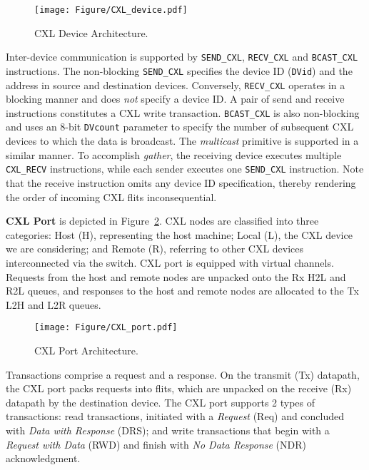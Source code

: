 \begin{figure}[h]
    \centering
    \texttt{[image: Figure/CXL\_device.pdf]}
    \caption{CXL Device Architecture.}
    \label{fig:CXL_device}
\end{figure}

Inter-device communication is supported by \texttt{SEND\_CXL}, \texttt{RECV\_CXL} and \texttt{BCAST\_CXL} instructions. The non-blocking
\texttt{SEND\_CXL} specifies the device ID (\texttt{DVid}) and the \rf{} address in source and destination devices. Conversely, \texttt{RECV\_CXL} operates in a blocking manner and does \textit{not} specify a device ID. A pair of send and receive instructions constitutes a CXL write transaction. 
\texttt{BCAST\_CXL} is also non-blocking and uses an 8-bit \texttt{DVcount} parameter to specify the number of subsequent CXL devices to which the data is broadcast.
The \textit{multicast} primitive is supported in a similar manner.
To accomplish \textit{gather}, the receiving device executes multiple \texttt{CXL\_RECV} instructions, while each sender executes one \texttt{SEND\_CXL} instruction. Note that the receive instruction omits any device ID specification, thereby rendering the order of incoming CXL flits inconsequential. 


\textbf{CXL Port} is depicted in Figure~\ref{fig:CXL_port}. 
CXL nodes are classified into three categories: Host (H), representing the host machine; Local (L), the CXL device we are considering; and Remote (R), referring to other CXL devices interconnected via the switch. CXL port is equipped with virtual channels. Requests from the host and remote nodes are unpacked onto the Rx H2L and R2L queues, and responses to the host and remote nodes are allocated to the Tx L2H and L2R queues.

\begin{figure}[h]
    \centering
    \texttt{[image: Figure/CXL\_port.pdf]}
    \caption{CXL Port Architecture.}
    \label{fig:CXL_port}
\end{figure}

Transactions comprise a request and a response. On the transmit (Tx) datapath, the CXL port packs requests into flits, which are unpacked on the receive (Rx) datapath by the destination device.
The CXL port supports 2 types of transactions: read transactions, initiated with a \textit{Request} (Req) and concluded with \textit{Data with Response} (DRS); and write transactions that begin with a \textit{Request with Data} (RWD) and finish with \textit{No Data Response} (NDR) acknowledgment. 


